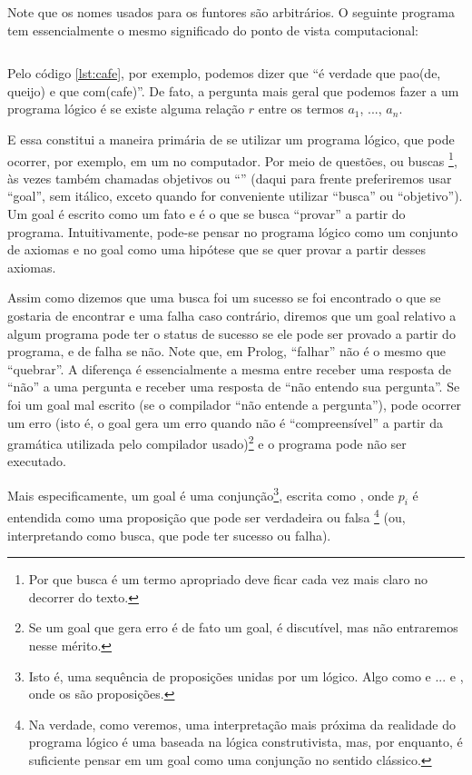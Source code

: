 Note que os nomes usados para os funtores são arbitrários. O seguinte programa tem essencialmente o mesmo significado do ponto de vista computacional:\\

%
    \begin{listing}
\inputminted{prolog}{../Exemplos/Cap0/prog2_queijo.pl}\label{lst:queijo}
    \end{listing}

Pelo código \ref{lst:cafe}, por exemplo, podemos dizer que ``é verdade que pao(de, queijo) e que com(cafe)''. De fato, a pergunta mais
geral que podemos fazer a um programa lógico é se existe alguma relação $r$ entre os termos $a_1$, ..., $a_n$.

E essa constitui a maneira primária de se utilizar um programa lógico, que pode ocorrer, por
exemplo, em um  no computador. Por meio de questões, ou buscas \footnote{Por que
  busca é um termo apropriado deve ficar cada vez mais claro no decorrer do texto.}, às vezes também
chamadas objetivos ou ``'' (daqui para frente preferiremos usar ``goal'', sem
itálico, exceto quando for conveniente utilizar ``busca'' ou ``objetivo''). Um goal é escrito como
um fato e é o que se busca ``provar'' a partir do programa. Intuitivamente, pode-se pensar no
programa lógico como um conjunto de axiomas e no goal como uma hipótese que se quer provar a partir desses axiomas.

Assim como dizemos que uma busca foi um sucesso se foi encontrado o que se gostaria de encontrar e uma falha caso contrário,
diremos que um goal relativo a algum programa pode ter o status de sucesso se ele pode ser provado a partir do programa, e de
falha se não. Note que, em Prolog, ``falhar'' não é o mesmo que ``quebrar''. A diferença é
essencialmente a mesma entre receber uma resposta de ``não'' a uma pergunta e receber uma resposta de
``não entendo sua pergunta''.  Se foi um goal mal escrito (se o compilador ``não entende a
pergunta''), pode ocorrer um erro (isto é, o goal gera um erro quando não é ``compreensível'' a
partir da gramática utilizada pelo compilador usado)\footnote{Se um goal que gera erro é de fato um
  goal, é discutível, mas não entraremos nesse mérito.} e o programa pode não ser executado.

Mais especificamente, um goal é uma conjunção\footnote{Isto é, uma sequência de proposições unidas
  por um  lógico. Algo como  e
  ... e , onde os  são proposições.}, escrita como , onde $p_i$ é
entendida como uma proposição que pode ser verdadeira ou falsa \footnote{Na verdade, como veremos,
  uma interpretação mais próxima da realidade do programa lógico é uma baseada na lógica
  construtivista, mas, por enquanto, é suficiente pensar em um goal como uma conjunção no sentido
  clássico.} (ou, interpretando como busca, que pode ter sucesso ou falha).

